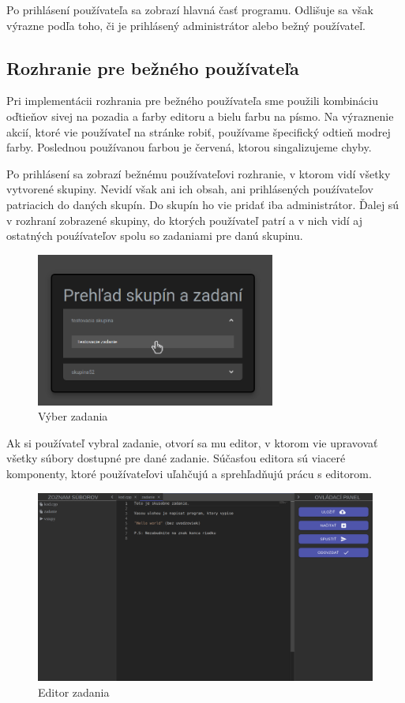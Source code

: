 Po prihlásení používateľa sa zobrazí hlavná časť programu. Odlišuje sa však výrazne podľa toho, či
je prihlásený administrátor alebo bežný používateľ.

\subsection{Rozhranie pre bežného používateľa}
Pri implementácii rozhrania pre bežného používateľa sme použili kombináciu oďtieňov sivej na pozadia
a farby editoru a bielu farbu na písmo. Na výraznenie akcií, ktoré vie používateľ na stránke robiť,
používame špecifický odtieň modrej farby. Poslednou používanou farbou je červená, ktorou
singalizujeme chyby.

Po prihlásení sa zobrazí bežnému používateľovi rozhranie, v ktorom vidí všetky vytvorené skupiny.
Nevidí však ani ich obsah, ani prihlásených pouźívateľov patriacich do daných skupín. Do skupín
ho vie pridať iba administrátor. Ďalej sú v rozhraní zobrazené skupiny, do ktorých používateľ patrí
a v nich vidí aj ostatných pouźívateľov spolu so zadaniami pre danú skupinu.
\begin{figure}[H]
\centerline{\includegraphics[width=0.7\textwidth]{images/vyber_zadania}}
\caption[Výber zadania]{Výber zadania}
\label{obr:vyber_zadania}
\end{figure}

Ak si používateľ vybral zadanie, otvorí sa mu editor, v ktorom vie upravovať všetky súbory dostupné
pre dané zadanie. Súčasťou editora sú viaceré komponenty, ktoré používateľovi uľahčujú a
sprehľadňujú prácu s editorom. 
\begin{figure}[H]
\centerline{\includegraphics[width=1\textwidth]{images/bezny_pouzivatel}}
\caption[Editor zadania]{Editor zadania}
\label{obr:bezny_pouzivatel}
\end{figure}

